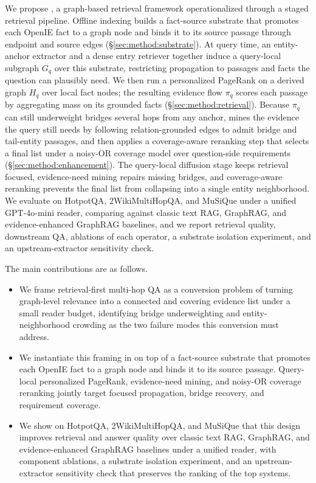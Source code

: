 We propose \methodname{}, a graph-based retrieval framework
operationalized through a staged retrieval pipeline. Offline
indexing builds a fact-source substrate that promotes each OpenIE
fact to a graph node and binds it to its source passage through
endpoint and source edges (\S\ref{sec:method:substrate}). At query
time, an entity-anchor extractor and a dense entry retriever
together induce a query-local subgraph $G_q$ over this substrate,
restricting propagation to passages and facts the question can
plausibly need. We then run a personalized PageRank on a derived
graph $H_q$ over local fact nodes; the resulting evidence flow
$\pi_q$ scores each passage by aggregating mass on its grounded
facts (\S\ref{sec:method:retrieval}). Because $\pi_q$ can still
underweight bridges several hops from any anchor, \methodname{}
mines the evidence the query still needs by following
relation-grounded edges to admit bridge and tail-entity passages,
and then applies a coverage-aware reranking step that selects a
final list under a noisy-OR coverage model over question-side
requirements (\S\ref{sec:method:enhancement}). The query-local
diffusion stage keeps retrieval focused, evidence-need mining
repairs missing bridges, and coverage-aware reranking prevents the
final list from collapsing into a single entity neighborhood. We
evaluate \methodname{} on HotpotQA, 2WikiMultiHopQA, and MuSiQue
under a unified GPT-4o-mini reader, comparing against classic text
RAG, GraphRAG, and evidence-enhanced GraphRAG baselines, and we
report retrieval quality, downstream QA, ablations of each
operator, a substrate isolation experiment, and an
upstream-extractor sensitivity check.

The main contributions are as follows.
\begin{itemize}
    \item We frame retrieval-first multi-hop QA as a conversion
    problem of turning graph-level relevance into a connected and
    covering evidence list under a small reader budget, identifying
    bridge underweighting and entity-neighborhood crowding as the
    two failure modes this conversion must address.
    \item We instantiate this framing in \methodname{} on top of a
    fact-source substrate that promotes each OpenIE fact to a graph
    node and binds it to its source passage. Query-local
    personalized PageRank, evidence-need mining, and noisy-OR
    coverage reranking jointly target focused propagation, bridge
    recovery, and requirement coverage.
    \item We show on HotpotQA, 2WikiMultiHopQA, and MuSiQue that
    this design improves retrieval and answer quality over classic
    text RAG, GraphRAG, and evidence-enhanced GraphRAG baselines
    under a unified reader, with component ablations, a substrate
    isolation experiment, and an upstream-extractor sensitivity
    check that preserves the ranking of the top systems.
\end{itemize}
